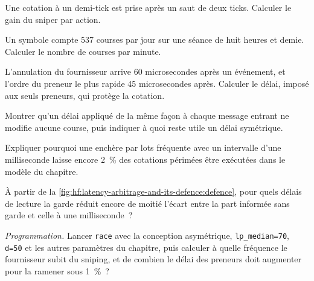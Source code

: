 \begin{exercise}[$\star$]\label{exo:hf:latency-arbitrage-and-its-defence:1}
Une cotation à un demi-tick est prise après un saut de deux ticks. Calculer le gain du sniper par action.
\end{exercise}

\begin{exercise}[$\star$]\label{exo:hf:latency-arbitrage-and-its-defence:2}
Un symbole compte 537 courses par jour sur une séance de huit heures et demie. Calculer le nombre de courses par minute.
\end{exercise}

\begin{exercise}[$\star$]\label{exo:hf:latency-arbitrage-and-its-defence:3}
L'annulation du fournisseur arrive 60 microsecondes après un événement, et l'ordre du preneur le plus rapide 45 microsecondes après. Calculer le délai, imposé aux seuls preneurs, qui protège la cotation.
\end{exercise}

\begin{exercise}[$\star\star$]\label{exo:hf:latency-arbitrage-and-its-defence:4}
Montrer qu'un délai appliqué de la même façon à chaque message entrant ne modifie aucune course, puis indiquer à quoi reste utile un délai symétrique.
\end{exercise}

\begin{exercise}[$\star\star$]\label{exo:hf:latency-arbitrage-and-its-defence:5}
Expliquer pourquoi une enchère par lots fréquente avec un intervalle d'une milliseconde laisse encore 2~\% des cotations périmées être exécutées dans le modèle du chapitre.
\end{exercise}

\begin{exercise}[$\star\star$]\label{exo:hf:latency-arbitrage-and-its-defence:6}
À partir de la \cref{fig:hf:latency-arbitrage-and-its-defence:defence}, pour quels délais de lecture la garde réduit encore de moitié l'écart entre la
part informée sans garde et celle à une milliseconde~?
\end{exercise}

\begin{exercise}[$\star\star\star$]\label{exo:hf:latency-arbitrage-and-its-defence:7}
\emph{Programmation.} Lancer \texttt{race} avec la conception asymétrique, \texttt{lp\_median=70}, \texttt{d=50} et les autres paramètres du chapitre, puis calculer à quelle fréquence le fournisseur subit du sniping, et de
combien le délai des preneurs doit augmenter pour la ramener sous 1~\%~?
\end{exercise}

